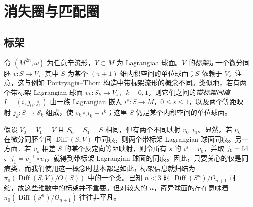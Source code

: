 ﻿\clearpage
\section{消失圈与匹配圈}\label{sec:16}
\subsection{标架}\label{sec:16a}
令 $(M^{2n},\omega)$ 为任意辛流形，$V\subset M$ 为 Lagrangian 球面。$V$ 的\emph{标架}是一个微分同胚 $v:S\to V$，其中 $S$ 为某个 $(n+1)$ 维内积空间的单位球面；$S$ 依赖于 $V$。注意，这与例如 Pontryagin–Thom 构造中带标架流形的概念不同。类似地，若有两个带标架 Lagrangian 球面 $v_k:S_k\to V_k$，$k=0,1$，则它们之间的\emph{带标架同痕} $I=(i,j_0,j_1)$
由一族 Lagrangian 嵌入 $i^s:S\to M$，$0\leq s\leq1$，以及两个等距映射 $j_k:S\to S_k$ 组成，使 $v_k\circ j_k=i^k$；这里 $S$ 仍是某个内积空间的单位球面。

\begin{note}\label{st:16.1}
假设 $V_0=V_1=V$ 且 $S_0=S_1=S$ 相同，但有两个不同映射 $v_0,v_1$。显然，若 $v_k$ 在微分同胚空间 $\operatorname{Diff}(S,V)$ 中同痕，则两个带标架 Lagrangian 球面同痕。另一方面，若 $v_k$ 相差 $S$ 的某个反定向等距映射，则令所有 $s$ 的 $i^s=v_0$，并取 $j_0=\operatorname{Id}$、$j_1=v_1^{-1}\circ v_0$，就得到带标架 Lagrangian 球面的同痕。因此，只要关心的仅是同痕类，而我们使用这一概念时基本都是如此，标架信息就归结为 $\pi_0(\operatorname{Diff}(S,V)/O(S))$ 中的一个类。已知 $n<3$ 时 $\operatorname{Diff}(S^n)/O_{n+1}$ 可缩，故这些维数中的标架并不重要。但对较大的 $n$，奇异球面的存在意味着 $\pi_0(\operatorname{Diff}(S^n)/O_{n+1})$ 往往非平凡。
\end{note}

